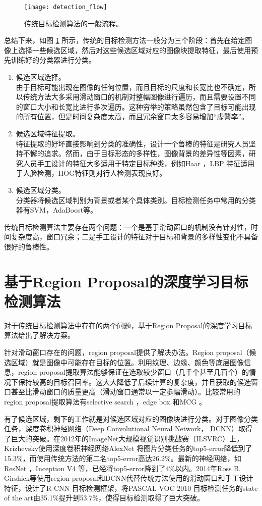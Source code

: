 \begin{figure}[!t]
	\centering
	\texttt{[image: detection\_flow]}
	\caption{传统目标检测算法的一般流程。}
	\label{detection_flow}
\end{figure}

总结下来，如图 \ref{detection_flow} 所示，传统的目标检测方法一般分为三个阶段：首先在给定图像上选择一些候选区域，然后对这些候选区域对应的图像块提取特征，最后使用预先训练好的分类器进行分类。
\begin{enumerate}
	\item 候选区域选择。\\
	由于目标可能出现在图像的任何位置，而且目标的尺度和长宽比也不确定，所以传统方法大多采用滑动窗口的机制对整幅图像进行遍历，而且需要设置不同的窗口大小和长宽比进行多次遍历。这种穷举的策略虽然包含了目标可能出现的所有位置，但是时间复杂度太高，而且冗余窗口太多容易增加``虚警率''。
	\item 候选区域特征提取。\\
	特征提取的好坏直接影响到分类的准确性，设计一个鲁棒的特征是研究人员坚持不懈的追求。然而，由于目标形态的多样性，图像背景的差异性等因素，研究人员手工设计的特征大多适用于特定目标种类，例如Haar \cite{via-jones-face}，LBP \cite{lbp} 特征适用于人脸检测，HOG特征则对行人检测表现良好。
	\item 候选区域分类。\\
	分类器将候选区域判别为背景或者某个具体类别。目标检测任务中常用的分类器有SVM，AdaBoost等。
\end{enumerate}
传统目标检测算法主要存在两个问题：一个是基于滑动窗口的机制没有针对性，时间复杂度高，窗口冗余；二是手工设计的特征对于目标和背景的多样性变化不具备很好的鲁棒性。

\section{基于Region Proposal的深度学习目标检测算法}
对于传统目标检测算法中存在的两个问题，基于Region Proposal的深度学习目标算法给出了解决方案。

针对滑动窗口存在的问题，region proposal提供了解决办法。Region proposal（候选区域）就是图像中可能存在目标的位置。利用纹理、边缘、颜色等底层图像信息，region proposal提取算法能够保证在选取较少窗口（几千个甚至几百个）的情况下保持较高的目标召回率。这大大降低了后续计算的复杂度，并且获取的候选窗口甚至比滑动窗口的质量更高（滑动窗口通常以一定歩幅滑动）。比较常用的region proposal提取算法有selective search \cite{selective-search}，edge box \cite{edge-box}和MCG \cite{mcg}。

有了候选区域，剩下的工作就是对候选区域对应的图像块进行分类。对于图像分类任务，深度卷积神经网络（Deep Convolutional Neural Network， DCNN）取得了巨大的突破。在2012年的ImageNet大规模视觉识别挑战赛（ILSVRC）上，Krizhevsky使用深度卷积神经网络AlexNet \cite{alexnet}将图片分类任务的top5-error降低到了15.3\%，而使用传统方法的第二名top5-error高达26.2\%。最新的神经网络，如ResNet \cite{resnet}，Inception V4 \cite{inception-v4}等，已经将top5-error降到了4\%以内。2014年Ross B. Girshick等使用region proposal和DCNN代替传统方法使用的滑动窗口和手工设计特征，设计了R-CNN \cite{rcnn}目标检测框架，将PASCAL VOC 2010 \cite{pascal-voc-2010} 目标检测任务的state of the art由35.1\%提升到53.7\%，使得目标检测取得了巨大突破。

